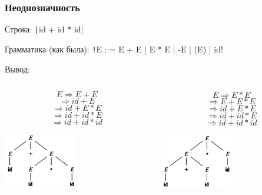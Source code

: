 \documentclass{../../slides-style}
\begin{document}
    \begin{frame}
        \frametitle{Неоднозначность}
        Строка: \texttt|id + id * id|

        Грамматика (как была): \texttt!E ::= E + E | E * E | -E | (E) | id!

        Вывод:
        \begin{columns}
            \begin{column}{0.5\textwidth}
                $$E \Rightarrow E + E$$
                $$\Rightarrow id + E$$
                $$\Rightarrow id + E * E$$
                $$\Rightarrow id + id * E$$
                $$\Rightarrow id + id * id$$
                \begin{center}
                    \includegraphics[width=0.5\textwidth]{ambiguousGrammarA.png}
                \end{center}
            \end{column}
            \begin{column}{0.5\textwidth}
                $$E \Rightarrow E * E$$
                $$\Rightarrow E + E * E$$
                $$\Rightarrow id + E * E$$
                $$\Rightarrow id + id * E$$
                $$\Rightarrow id + id * id$$
                \begin{center}
                    \includegraphics[width=0.5\textwidth]{ambiguousGrammarB.png}
                \end{center}
            \end{column}
        \end{columns}
    \end{frame}
\end{document}
